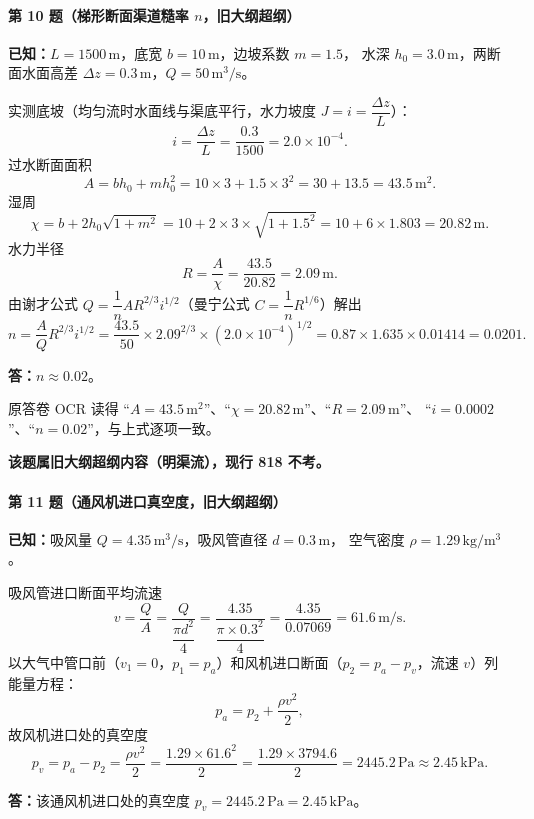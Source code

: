\paragraph{第 10 题（梯形断面渠道糙率 $n$，旧大纲超纲）}
\begin{jie}
\textbf{已知：}$L=1500\,\mathrm{m}$，底宽 $b=10\,\mathrm{m}$，边坡系数 $m=1.5$，
水深 $h_0=3.0\,\mathrm{m}$，两断面水面高差 $\Delta z=0.3\,\mathrm{m}$，$Q=50\,\mathrm{m^3/s}$。

实测底坡（均匀流时水面线与渠底平行，水力坡度 $J=i=\dfrac{\Delta z}{L}$）：
\[
i=\frac{\Delta z}{L}=\frac{0.3}{1500}=2.0\times10^{-4}.
\]
过水断面面积
\[
A=bh_0+mh_0^{2}=10\times3+1.5\times3^{2}=30+13.5=43.5\,\mathrm{m^{2}}.
\]
湿周
\[
\chi=b+2h_0\sqrt{1+m^{2}}=10+2\times3\times\sqrt{1+1.5^{2}}=10+6\times1.803=20.82\,\mathrm{m}.
\]
水力半径
\[
R=\frac{A}{\chi}=\frac{43.5}{20.82}=2.09\,\mathrm{m}.
\]
由谢才公式 $Q=\dfrac{1}{n}AR^{2/3}i^{1/2}$（曼宁公式 $C=\dfrac{1}{n}R^{1/6}$）解出
\[
n=\frac{A}{Q}R^{2/3}i^{1/2}
=\frac{43.5}{50}\times2.09^{2/3}\times(2.0\times10^{-4})^{1/2}
=0.87\times1.635\times0.01414=0.0201 .
\]

\textbf{答：}$n\approx0.02$。
\end{jie}

\begin{tishi}
原答卷 OCR 读得 ``$A=43.5\,\mathrm{m^2}$''、``$\chi=20.82\,\mathrm{m}$''、``$R=2.09\,\mathrm{m}$''、
``$i=0.0002$''、``$n=0.02$''，与上式逐项一致。

\textbf{该题属旧大纲超纲内容（明渠流），现行 818 不考。}
\end{tishi}

\paragraph{第 11 题（通风机进口真空度，旧大纲超纲）}
\begin{jie}
\textbf{已知：}吸风量 $Q=4.35\,\mathrm{m^{3}/s}$，吸风管直径 $d=0.3\,\mathrm{m}$，
空气密度 $\rho=1.29\,\mathrm{kg/m^3}$。

吸风管进口断面平均流速
\[
v=\frac{Q}{A}=\frac{Q}{\dfrac{\pi d^{2}}{4}}
=\frac{4.35}{\dfrac{\pi\times0.3^{2}}{4}}
=\frac{4.35}{0.07069}=61.6\,\mathrm{m/s}.
\]
以大气中管口前（$v_1=0$，$p_1=p_a$）和风机进口断面（$p_2=p_a-p_v$，流速 $v$）列能量方程：
\[
p_a=p_2+\frac{\rho v^{2}}{2},
\]
故风机进口处的真空度
\[
p_v=p_a-p_2=\frac{\rho v^{2}}{2}
=\frac{1.29\times61.6^{2}}{2}
=\frac{1.29\times3794.6}{2}=2445.2\,\mathrm{Pa}\approx2.45\,\mathrm{kPa}.
\]

\textbf{答：}该通风机进口处的真空度 $p_v=2445.2\,\mathrm{Pa}=2.45\,\mathrm{kPa}$。
\end{jie}

